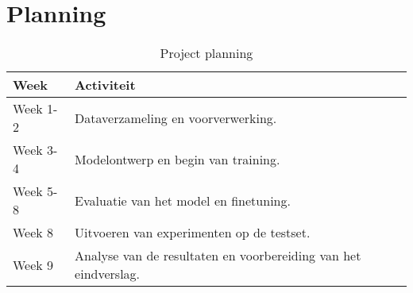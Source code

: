 \documentclass{article}
\begin{document}
\section{Planning}

\begin{table}[ht]
    \centering
    \begin{tabularx}{\textwidth}{|l|X|}
        \hline
        \textbf{Week} & \textbf{Activiteit} \\ \hline
        Week 1-2 & Dataverzameling en voorverwerking. \\ \hline
        Week 3-4 & Modelontwerp en begin van training. \\ \hline
        Week 5-8 & Evaluatie van het model en finetuning. \\ \hline
        Week 8 & Uitvoeren van experimenten op de testset. \\ \hline
        Week 9 & Analyse van de resultaten en voorbereiding van het eindverslag. \\ \hline
    \end{tabularx}
    \caption{Project planning}
    \label{tab:project_planning}
    \end{table}
\end{document}
